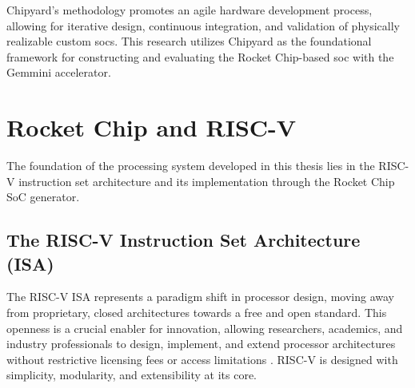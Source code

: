 Chipyard's methodology promotes an agile hardware development process, allowing for iterative design, continuous integration, and validation of physically realizable custom \glspl{soc}. This research utilizes Chipyard as the foundational framework for constructing and evaluating the Rocket Chip-based \gls{soc} with the Gemmini accelerator.

\section{Rocket Chip and RISC-V}
\label{sec:rocketchip_riscv}

The foundation of the processing system developed in this thesis lies in the RISC-V instruction set architecture and its implementation through the Rocket Chip SoC generator.

\subsection{The RISC-V Instruction Set Architecture (ISA)}
\label{sec:riscv_isa}

The RISC-V ISA represents a paradigm shift in processor design, moving away from proprietary, closed architectures towards a free and open standard. This openness is a crucial enabler for innovation, allowing researchers, academics, and industry professionals to design, implement, and extend processor architectures without restrictive licensing fees or access limitations \cite{asanovic2014riscv}. RISC-V is designed with simplicity, modularity, and extensibility at its core.

